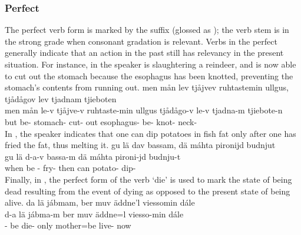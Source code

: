 \subsubsection{Perfect}\label{perfectAspect}
The perfect verb form is marked by the suffix  (glossed as \PRFs); the verb stem is in the strong grade when consonant gradation is relevant. Verbs in the perfect generally indicate that an action in the past still has relevancy in the present situation. For instance, in  the speaker is slaughtering a reindeer, and is now able to cut out the stomach because the esophagus has been knotted, preventing the stomach’s contents from running out. 
\ea\label{perfectEx1}%
\glll	men mån lev tjåjvev ruhtastemin ullgus, tjådågov lev tjadnam tjieboten\\
	men mån le-v tjåjve-v ruhtaste-min ullgus tjådågo-v le-v tjadna-m tjiebote-n\\
	but  be- stomach- cut- out esophagus- be- knot- neck-\\\nopagebreak
{}	
\z
In , the speaker indicates that one can dip potatoes in fish fat only after one has fried the fat, thus melting it.
\ea\label{perfectEx2}%
\glll	gu lä dav bassam, dä máhta pironijd budnjut\\
	gu lä d-a-v bassa-m dä máhta pironi-jd budnju-t\\
	when be\BS{} -\BS{} fry- then can\BS{} potato- dip-\\\nopagebreak
{}	
\z
Finally, in , the perfect form of the verb  ‘die’ is used 
to mark the state of being dead resulting from the event of dying as opposed to the present state of being alive. 
\ea\label{perfectEx3}%
\glll	da lä jábmam, ber muv äddne'l viessomin dále\\
	d-a lä jábma-m ber muv äddne=l viesso-min dále\\
	-\BS{} be\BS{} die- only  mother\BS{}=be\BS{} live- now\\\nopagebreak
{}	
\z
